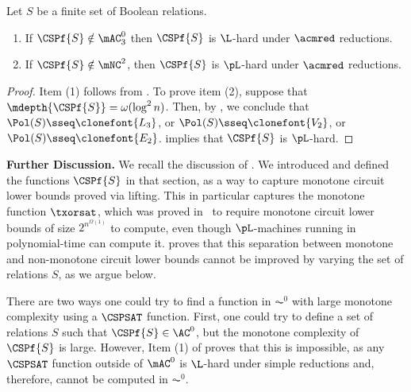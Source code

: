 \documentclass[11pt]{article}
\begin{document}
\begin{theorem}
    \label{thm:cspsat-hard}
    Let $S$ be a finite set of Boolean relations.
    \begin{enumerate}
        \item 
            If
            $\CSPf{S} \notin 
            \mAC^0_3$
            then $\CSPf{S}$ is $\L$-hard
            under
            $\acmred$ reductions.
        \item 
            If
            $\CSPf{S} \notin \mNC^2$,
            then $\CSPf{S}$ is $\pL$-hard
            under
            $\acmred$ reductions.
    \end{enumerate}
\end{theorem}
\begin{proof}
    Item (1) follows 
            from .
    To prove item (2),
            suppose that $\mdepth{\CSPf{S}} = {\omega(\log^2 n)}$.
            Then, by ,
            we conclude that 
            $\Pol(S) \sseq \clonefont{L_3}$, or
            $\Pol(S) \sseq \clonefont{V_2}$, or
            $\Pol(S) \sseq \clonefont{E_2}$.
            implies that
            $\CSPf{S}$ is $\pL$-hard.
            \qedhere
\end{proof}

\noindent \textbf{Further Discussion.} We recall the discussion of .
We introduced and defined the functions $\CSPf{S}$ in that section,
as a way to capture monotone circuit lower bounds proved via lifting.
This in particular captures the monotone function $\txorsat$,
which was proved in~\cite{gkrs19} to require monotone circuit lower bounds
of size $2^{n^{\Omega(1)}}$ to compute, even though 
$\pL$-machines running in 
polynomial-time
can compute it.
proves that this separation between monotone and non-monotone circuit lower
bounds cannot be improved by varying the set of relations $S$, as we argue
below.

There are two ways one could try to find a function in $\AC^0$
with large monotone complexity using a $\CSPSAT$ function.
First, one could try to define a set of relations $S$
such that $\CSPf{S} \in \AC^0$, but the monotone complexity of
$\CSPf{S}$ is large.
However, 
Item (1) of 
proves that this is impossible,
as any $\CSPSAT$ function outside of $\mAC^0$
is $\L$-hard under simple reductions and, therefore, cannot be computed in $\AC^0$.
\end{document}
